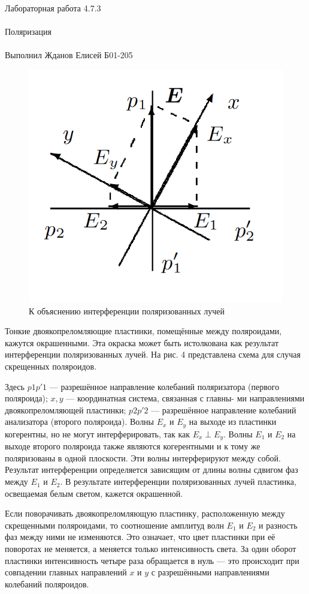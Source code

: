 \documentclass{astroedu-lab}
\begin{document}
\begin{problem}{\huge Лабораторная работа 4.7.3\\\\Поляризация\\\\Выполнил Жданов Елисей Б01-205}
\begin{figure}
	\includegraphics[width=\linewidth]{4}
	\caption{К объяснению интерференции
поляризованных лучей}
	\label{ris 4}
\end{figure}


Тонкие двоякопреломляющие пластинки, помещённые между поляроидами, кажутся окрашенными. Эта окраска может быть истолкована как результат интерференции поляризованных лучей. На рис. 4 представлена схема для
случая скрещенных поляроидов.

Здесь $ p1p'1 $ --- разрешённое направление колебаний поляризатора
(первого поляроида); $ x, y $ --- координатная система, связанная с главны-
ми направлениями двоякопреломляющей пластинки; $ p2p'2 $ --- разрешённое направление колебаний анализатора (второго поляроида). Волны
$ E_x  $ и $ E_y $ на выходе из пластинки когерентны, но не могут интерферировать, так как $ E_x \perp  E_y $. Волны $ E_1 $ и $ E_2 $ на выходе второго поляроида
также являются когерентными и к тому же поляризованы в одной плоскости. Эти волны интерферируют между собой. Результат интерференции определяется зависящим от длины волны сдвигом фаз между $ E_1 $
и $ E_2 $. В результате интерференции поляризованных лучей пластинка, освещаемая белым светом, кажется окрашенной.

Если поворачивать двоякопреломляющую пластинку, расположенную между
скрещенными поляроидами, то соотношение амплитуд волн $ E_1 $ и $ E_2 $ и разность фаз между ними не изменяются. Это означает, что цвет пластинки при её поворотах не меняется, а меняется только интенсивность света. За один оборот пластинки интенсивность четыре раза обращается в нуль --- это происходит при совпадении главных направлений
$ x $ и $ y $ с разрешёнными направлениями колебаний поляроидов.


\end{problem}
\end{document}
